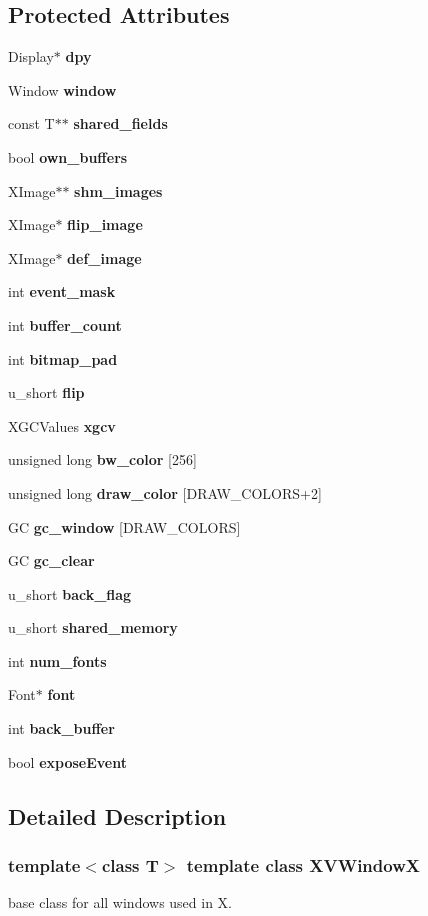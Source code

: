 \subsection*{Protected Attributes}
\begin{CompactItemize}
\item 
Display$\ast$ {\bf dpy}
\item 
Window {\bf window}
\item 
const T$\ast$$\ast$ {\bf shared\_\-fields}
\item 
bool {\bf own\_\-buffers}
\item 
XImage$\ast$$\ast$ {\bf shm\_\-images}
\item 
XImage$\ast$ {\bf flip\_\-image}
\item 
XImage$\ast$ {\bf def\_\-image}
\item 
int {\bf event\_\-mask}
\item 
int {\bf buffer\_\-count}
\item 
int {\bf bitmap\_\-pad}
\item 
u\_\-short {\bf flip}
\item 
XGCValues {\bf xgcv}
\item 
unsigned long {\bf bw\_\-color} \mbox{[}256\mbox{]}
\item 
unsigned long {\bf draw\_\-color} \mbox{[}DRAW\_\-COLORS+2\mbox{]}
\item 
GC {\bf gc\_\-window} \mbox{[}DRAW\_\-COLORS\mbox{]}
\item 
GC {\bf gc\_\-clear}
\item 
u\_\-short {\bf back\_\-flag}
\item 
u\_\-short {\bf shared\_\-memory}
\item 
int {\bf num\_\-fonts}
\item 
Font$\ast$ {\bf font}
\item 
int {\bf back\_\-buffer}
\item 
bool {\bf expose\-Event}
\end{CompactItemize}


\subsection{Detailed Description}
\subsubsection*{template$<$class T$>$  template class XVWindow\-X}

base class for all windows used in X.





